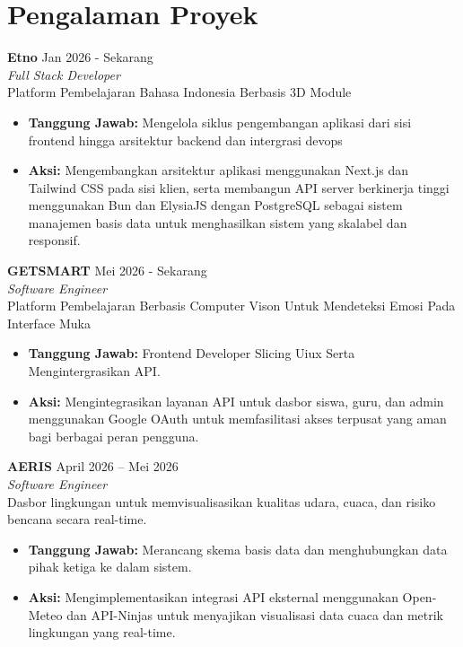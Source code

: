 \documentclass[11pt,a4paper]{article}
\begin{document}
\section*{Pengalaman Proyek}

\textbf{Etno} \hfill Jan 2026 - Sekarang \\
\textit{Full Stack Developer} \\
Platform Pembelajaran Bahasa Indonesia Berbasis 3D Module 
\begin{itemize}[leftmargin=0.25in]
    \item \textbf{Tanggung Jawab:} Mengelola siklus pengembangan aplikasi dari sisi frontend hingga arsitektur backend dan intergrasi devops
    \item \textbf{Aksi:} Mengembangkan arsitektur aplikasi menggunakan Next.js dan Tailwind CSS pada sisi klien, serta membangun API server berkinerja tinggi menggunakan Bun dan ElysiaJS dengan PostgreSQL sebagai sistem manajemen basis data untuk menghasilkan sistem yang skalabel dan responsif.
\end{itemize}

\textbf{GETSMART} \hfill Mei 2026 - Sekarang \\
\textit{Software Engineer} \\
Platform Pembelajaran Berbasis Computer Vison Untuk Mendeteksi Emosi Pada Interface Muka
\begin{itemize}[leftmargin=0.25in]
    \item \textbf{Tanggung Jawab:} Frontend Developer Slicing Uiux Serta Mengintergrasikan API.
    \item \textbf{Aksi:} Mengintegrasikan layanan API untuk dasbor siswa, guru, dan admin menggunakan Google OAuth untuk memfasilitasi akses terpusat yang aman bagi berbagai peran pengguna.
\end{itemize}

\textbf{AERIS} \hfill April 2026 -- Mei 2026 \\
\textit{Software Engineer} \\
Dasbor lingkungan untuk memvisualisasikan kualitas udara, cuaca, dan risiko bencana secara real-time.
\begin{itemize}[leftmargin=0.25in]
    \item \textbf{Tanggung Jawab:} Merancang skema basis data dan menghubungkan data pihak ketiga ke dalam sistem.
    \item \textbf{Aksi:} Mengimplementasikan integrasi API eksternal menggunakan Open-Meteo dan API-Ninjas untuk menyajikan visualisasi data cuaca dan metrik lingkungan yang real-time.
\end{itemize}
\end{document}
